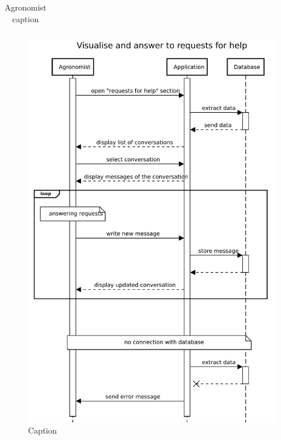\begin{table}[H]
\begin{tabular}[c]{|l|p{}|}
    \end{tabular}
    \caption{\label{tab:help_request_section_access}Agronomist caption }
\end{table}

\begin{figure}[H]
    \centering
    \includegraphics[scale=0.75]{Images/Sequence diagrams/Agronomist - visualise and answer requests for help.pdf}
    \caption{Caption}
    \label{fig:fig:seq_diag_answer_request}
\end{figure}


